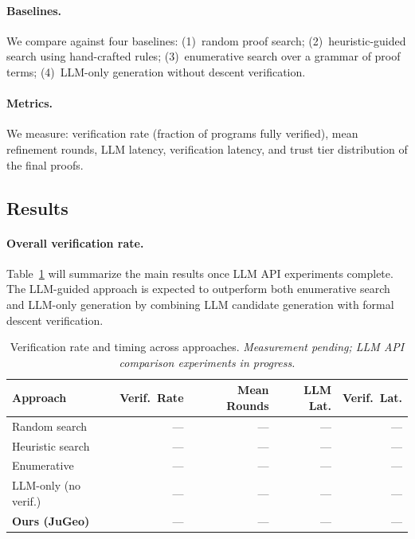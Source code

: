 \documentclass[11pt]{article}
\begin{document}
\paragraph{Baselines.}
We compare against four baselines: (1)~random proof search;
(2)~heuristic-guided search using hand-crafted rules;
(3)~enumerative search over a grammar of proof terms;
(4)~LLM-only generation without descent verification.

\paragraph{Metrics.}
We measure: verification rate (fraction of programs fully verified),
mean refinement rounds, LLM latency, verification latency, and
trust tier distribution of the final proofs.

\subsection{Results}\label{subsec:results}

\paragraph{Overall verification rate.}
Table~\ref{tab:main-results} will summarize the main results once LLM API
experiments complete.  The LLM-guided approach is expected to outperform
both enumerative search and LLM-only generation by combining LLM candidate
generation with formal descent verification.

\begin{table}[H]
\centering
\caption{Verification rate and timing across approaches.
  \emph{Measurement pending; LLM API comparison experiments in progress.}}
\label{tab:main-results}
\begin{tabular}{lrrrr}
\toprule
\textbf{Approach} & \textbf{Verif.\ Rate} & \textbf{Mean Rounds}
  & \textbf{LLM Lat.} & \textbf{Verif.\ Lat.} \\
\midrule
Random search        & --- & --- & --- & --- \\
Heuristic search     & --- & --- & --- & --- \\
Enumerative          & --- & --- & --- & --- \\
LLM-only (no verif.) & --- & --- & --- & --- \\
\textbf{Ours (JuGeo)} & --- & --- & --- & --- \\
\bottomrule
\end{tabular}
\end{table}
\end{document}

